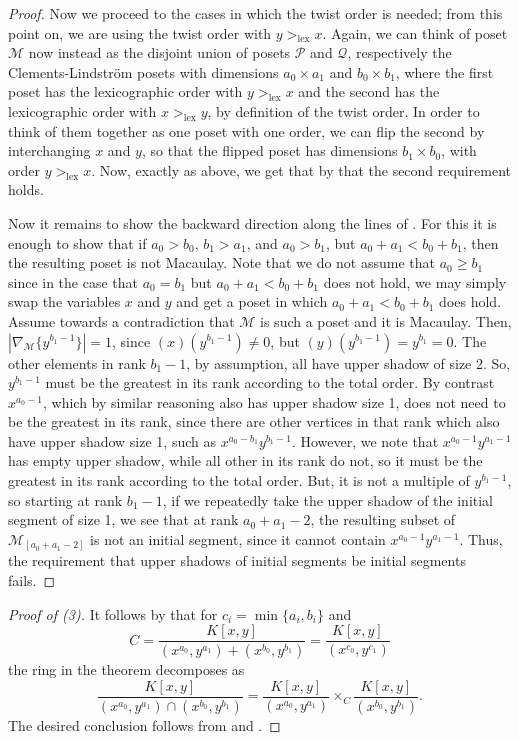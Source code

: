 \documentclass[11pt, reqno]{amsart}
\newcommand{\Q}{{\mathcal Q}}
\renewcommand{\P}{{\mathcal P}}
\def\lex{\operatorname{lex}}
\theoremstyle{plain} %
\theoremstyle{definition}
\theoremstyle{remark}
\numberwithin{equation}{section}  %
\begin{document}
\begin{proof}
Now we proceed to the cases in which the twist order is needed; from this point on, we are using the twist order with $y >_{\lex} x$. Again, we can think of poset $\mathcal{M}$ now instead as the disjoint union of posets $\P$ and $\Q$, respectively the Clements-Lindstr\"om posets with dimensions $a_0 \times a_1$ and $b_0 \times b_1$, where the first poset has the lexicographic order with $y >_{\lex} x$ and the second has the lexicographic order with $x >_{\lex} y$, by definition of the twist order.  In order to think of them together as one poset with one order, we can flip the second by interchanging $x$ and $y$, so that the flipped poset  has dimensions $b_1 \times b_0$, with order $y>_{\lex}x$. Now, exactly as above, we get that by  that the second requirement holds. 

Now it remains to show the backward direction along the lines of . For this it is enough to show that if $a_0 > b_0$, $b_1 > a_1$, and $a_0 > b_1$, but $a_0 + a_1 < b_0 + b_1$, then the resulting poset is not Macaulay. Note that we do not assume that $a_0 \geq b_1$ since in the case that $a_0 = b_1$ but $a_0 + a_1 < b_0 + b_1$ does not hold, we may simply swap the variables $x$ and $y$ and get a poset in which $a_0 + a_1 < b_0 + b_1$ does hold. Assume towards a contradiction that $\mathcal{M}$ is such a poset and it is Macaulay. Then, $|\nabla_{\mathcal{M}}\{y^{b_1-1}\}| = 1$, since $(x)(y^{b_1-1}) \neq 0$, but $(y)(y^{b_1-1})=y^{b_1}=0$. The other elements in rank $b_1-1$, by assumption, all have upper shadow of size 2. So, $y^{b_1-1}$ must be the greatest in its rank according to the total order. By contrast $x^{a_0-1}$, which by similar reasoning also has upper shadow size 1, does not need to be the greatest in its rank, since there are other vertices in that rank which also have upper shadow size 1, such as $x^{a_0-b_1}y^{b_1-1}$. However, we note that $x^{a_0-1}y^{a_1-1}$ has empty upper shadow, while all other in its rank do not, so it must be the greatest in its rank according to the total order. But, it is not a multiple of $y^{b_1-1}$, so starting at rank $b_1-1$, if we repeatedly take the upper shadow of the initial segment of size 1, we see that at rank $a_0+a_1-2$, the resulting subset of $\mathcal{M}_{[a_0+a_1-2]}$ is not an initial segment, since it cannot contain $x^{a_0-1}y^{a_1-1}$. Thus, the requirement that upper shadows of initial segments be initial segments fails. 
\end{proof} 

\begin{proof}[Proof of  (3)] \label{proof D3}
    It follows by  that for $c_i=\min\{a_i,b_i\}$ and 
    \[
    C=\frac{K[x,y]}{(x^{a_0}, y^{a_1})+(x^{b_0},y^{b_1})}=\frac{K[x,y]}{(x^{c_0},y^{c_1})}
    \]
    the ring in the theorem decomposes as 
   \[
     \frac{K[x,y]}{(x^{a_0}, y^{a_1})\cap(x^{b_0},y^{b_1})} =\frac{K[x,y]}{(x^{a_0}, y^{a_1})}\times_C \frac{K[x,y]}{(x^{b_0},y^{b_1})}.
    \]
    The desired conclusion follows from  and .
\end{proof}
\end{document}
